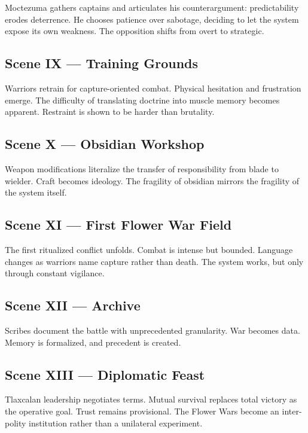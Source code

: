 \documentclass[12pt]{article}
\begin{document}
Moctezuma gathers captains and articulates his counterargument: predictability erodes deterrence. He chooses patience over sabotage, deciding to let the system expose its own weakness. The opposition shifts from overt to strategic.

\subsection*{Scene IX — Training Grounds}

Warriors retrain for capture-oriented combat. Physical hesitation and frustration emerge. The difficulty of translating doctrine into muscle memory becomes apparent. Restraint is shown to be harder than brutality.

\subsection*{Scene X — Obsidian Workshop}

Weapon modifications literalize the transfer of responsibility from blade to wielder. Craft becomes ideology. The fragility of obsidian mirrors the fragility of the system itself.

\subsection*{Scene XI — First Flower War Field}

The first ritualized conflict unfolds. Combat is intense but bounded. Language changes as warriors name capture rather than death. The system works, but only through constant vigilance.

\subsection*{Scene XII — Archive}

Scribes document the battle with unprecedented granularity. War becomes data. Memory is formalized, and precedent is created.

\subsection*{Scene XIII — Diplomatic Feast}

Tlaxcalan leadership negotiates terms. Mutual survival replaces total victory as the operative goal. Trust remains provisional. The Flower Wars become an inter-polity institution rather than a unilateral experiment.
\end{document}
